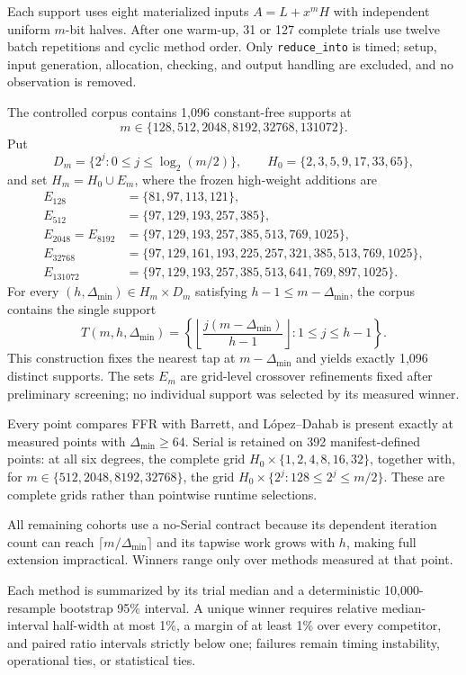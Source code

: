 \documentclass{mcom-l}
\numberwithin{equation}{section}
\theoremstyle{definition}
\theoremstyle{remark}
\newcommand{\Dmin}{\Delta_{\min}}
\begin{document}
Each support uses eight materialized inputs $A=L+x^mH$ with independent uniform
$m$-bit halves.  After one warm-up, 31 or 127 complete trials use twelve batch
repetitions and cyclic method order.  Only \texttt{reduce\_into} is timed;
setup, input generation, allocation, checking, and output handling are
excluded, and no observation is removed.

The controlled corpus contains 1,096 constant-free supports at
\[
  m\in\{128,512,2048,8192,32768,131072\}.
\]
Put
\[
  D_m=\{2^j:0\le j\le\log_2(m/2)\},\qquad
  H_0=\{2,3,5,9,17,33,65\},
\]
and set $H_m=H_0\cup E_m$, where the frozen high-weight additions are
\begin{align*}
E_{128}&=\{81,97,113,121\},\\
E_{512}&=\{97,129,193,257,385\},\\
E_{2048}=E_{8192}&=\{97,129,193,257,385,513,769,1025\},\\
E_{32768}&=\{97,129,161,193,225,257,321,385,513,769,1025\},\\
E_{131072}&=\{97,129,193,257,385,513,641,769,897,1025\}.
\end{align*}
For every $(h,\Dmin)\in H_m\times D_m$ satisfying
$h-1\le m-\Dmin$, the corpus contains the single support
\[
  T(m,h,\Dmin)
  =\left\{\left\lfloor\frac{j(m-\Dmin)}{h-1}\right\rfloor:
    1\le j\le h-1\right\}.
\]
This construction fixes the nearest tap at $m-\Dmin$ and yields exactly 1,096
distinct supports.  The sets $E_m$ are grid-level crossover refinements fixed
after preliminary screening; no individual support was selected by its
measured winner.

Every point compares FFR with Barrett, and L\'opez--Dahab is present exactly at
measured points with $\Dmin\ge64$.  Serial is retained on 392 manifest-defined
points: at all six degrees, the complete grid
$H_0\times\{1,2,4,8,16,32\}$, together with, for
$m\in\{512,2048,8192,32768\}$, the grid
$H_0\times\{2^j:128\le2^j\le m/2\}$.  These are complete grids rather than
pointwise runtime selections.

All remaining cohorts use a no-Serial contract
because its dependent iteration count can reach $\lceil m/\Dmin\rceil$ and its
tapwise work grows with $h$, making full extension impractical.
Winners range only over methods measured at that point.

Each method is summarized by its trial median and a deterministic
10,000-resample bootstrap 95\% interval.  A unique winner requires relative
median-interval half-width at most 1\%, a margin of at least 1\% over every
competitor, and paired ratio intervals strictly below one; failures remain
timing instability, operational ties, or statistical ties.
\end{document}
